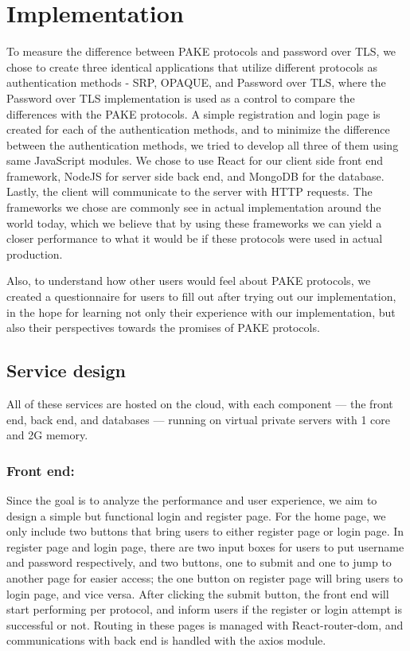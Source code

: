 \section{Implementation}
\label{sec:implementation}

To measure the difference between PAKE protocols and password over TLS, we chose to create three identical applications that utilize different protocols as authentication methods - SRP, OPAQUE, and Password over TLS, where the Password over TLS implementation is used as a control to compare the differences with the PAKE protocols.
A simple registration and login page is created for each of the authentication methods, and to minimize the difference between the authentication methods, we tried to develop all three of them using same JavaScript modules. 
We chose to use React for our client side front end framework, NodeJS for server side back end, and MongoDB for the database.
Lastly, the client will communicate to the server with HTTP requests.
The frameworks we chose are commonly see in actual implementation around the world today, which we believe that by using these frameworks we can yield a closer performance to what it would be if these protocols were used in actual production.~\cite{swacha2023evolution}

Also, to understand how other users would feel about PAKE protocols, we created a questionnaire for users to fill out after trying out our implementation, in the hope for learning not only their experience with our implementation, but also their perspectives towards the promises of PAKE protocols.


\subsection{Service design}
All of these services are hosted on the cloud, with each component — the front end, back end, and databases — running on virtual private servers with 1 core and 2G memory.

\subsubsection{Front end:}
Since the goal is to analyze the performance and user experience, we aim to design a simple but functional login and register page. 
For the home page, we only include two buttons that bring users to either register page or login page.
In register page and login page, there are two input boxes for users to put username and password respectively, and two buttons, one to submit and one to jump to another page for easier access; the one button on register page will bring users to login page, and vice versa.
After clicking the submit button, the front end will start performing per protocol, and inform users if the register or login attempt is successful or not.
Routing in these pages is managed with React-router-dom, and communications with back end is handled with the axios module.

